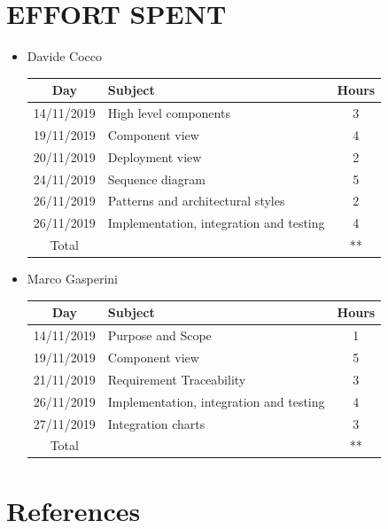 \documentclass[12pt,a4paper]{article}
\begin{document}
\section{EFFORT SPENT}
\begin{itemize}
\item {Davide Cocco}
 \begin{center}
			\begin{tabular}{| c | l | c |}
				\hline
				\textbf{Day} & \textbf{Subject} & \textbf{Hours} \\ \hline
				14/11/2019 & High level components & 3 \\ \hline
				19/11/2019 & Component view & 4 \\ \hline
				20/11/2019 & Deployment view & 2 \\ \hline
24/11/2019 & Sequence diagram & 5 \\ \hline
26/11/2019 & Patterns and architectural styles & 2 \\ \hline
26/11/2019 & Implementation, integration and testing & 4 \\ \hline
				Total & & ** \\ \hline
			\end{tabular}
		\end{center}
\item {Marco Gasperini}
\begin{center}
			\begin{tabular}{| c | l | c |}
				\hline
				\textbf{Day} & \textbf{Subject} & \textbf{Hours} \\ \hline
				14/11/2019 & Purpose and Scope & 1 \\ \hline
				19/11/2019 & Component view & 5 \\ \hline
				21/11/2019 & Requirement Traceability & 3 \\ \hline
				26/11/2019 & Implementation, integration and testing & 4 \\ \hline
				27/11/2019 & Integration charts & 3 \\ \hline
				Total & & ** \\ \hline
			\end{tabular}
\end{center}
\end{itemize}
\section{References}
\end{document}
